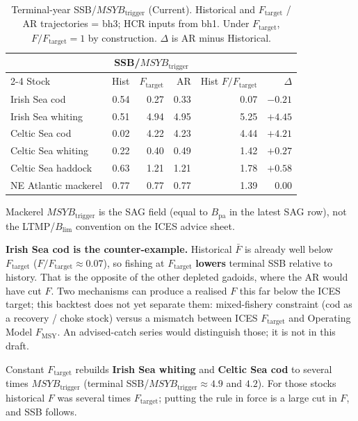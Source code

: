 \documentclass[11pt,a4paper]{article}
\newcommand{\Ftar}{F_{\mathrm{target}}}
\newcommand{\Blim}{B_{\lim}}
\newcommand{\Btrig}{MSYB_{\mathrm{trigger}}}
\begin{document}
\begin{table}[h]
\centering
\small
\begin{threeparttable}
\caption{Terminal-year SSB/$\Btrig$ (Current). Historical and $F_{\mathrm{target}}$ / AR trajectories = bh3; HCR inputs from bh1. Under $F_{\mathrm{target}}$, $F/\Ftar=1$ by construction. $\Delta$ is AR minus Historical.}
\label{tab:path}
\setlength{\tabcolsep}{5pt}
\begin{tabular}{@{}l rrr r r@{}}
\toprule
& \multicolumn{3}{c}{SSB/$\Btrig$} & & \\
\cmidrule(lr){2-4}
Stock & Hist & $F_{\mathrm{target}}$ & AR & Hist $F/\Ftar$ & $\Delta$ \\
\midrule
Irish Sea cod        & 0.54 & 0.27 & 0.33 & 0.07 & $-0.21$ \\
Irish Sea whiting    & 0.51 & 4.94 & 4.95 & 5.25 & $+4.45$ \\
Celtic Sea cod       & 0.02 & 4.22 & 4.23 & 4.44 & $+4.21$ \\
Celtic Sea whiting   & 0.22 & 0.40 & 0.49 & 1.42 & $+0.27$ \\
Celtic Sea haddock   & 0.63 & 1.21 & 1.21 & 1.78 & $+0.58$ \\
NE Atlantic mackerel\tnote{a} & 0.77 & 0.77 & 0.77 & 1.39 & $0.00$ \\
\bottomrule
\end{tabular}
\begin{tablenotes}[flushleft]\footnotesize
\item[a] Mackerel $\Btrig$ is the SAG field (equal to $B_{\mathrm{pa}}$ in the latest SAG row), not the LTMP/$\Blim$ convention on the ICES advice sheet.
\end{tablenotes}
\end{threeparttable}
\end{table}

\textbf{Irish Sea cod is the counter-example.} Historical $\bar F$ is already well below $\Ftar$ ($F/\Ftar \approx 0.07$), so fishing at $\Ftar$ \textbf{lowers} terminal SSB relative to history. That is the opposite of the other depleted gadoids, where the AR would have cut $F$. Two mechanisms can produce a realised $F$ this far below the ICES target; this backtest does not yet separate them: mixed-fishery constraint (cod as a recovery / choke stock) versus a mismatch between ICES $\Ftar$ and Operating Model $F_{\mathrm{MSY}}$. An advised-catch series would distinguish those; it is not in this draft.

Constant $\Ftar$ rebuilds \textbf{Irish Sea whiting} and \textbf{Celtic Sea cod} to several times $\Btrig$ (terminal SSB/$\Btrig \approx 4.9$ and $4.2$). For those stocks historical $F$ was several times $\Ftar$; putting the rule in force is a large cut in $F$, and SSB follows.
\end{document}
